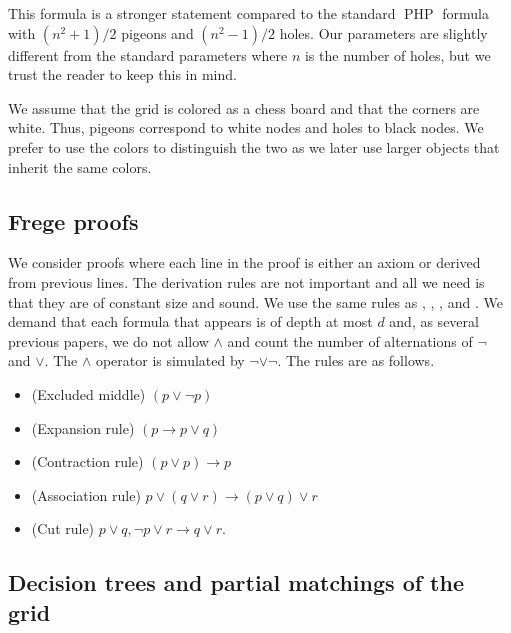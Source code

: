 \documentclass{article}\usepackage[a4paper,margin=20mm]{geometry}
\DeclareMathOperator{\PHP}{PHP}
\begin{document}
This formula is a stronger statement compared to
the standard $\PHP$ formula with
$(n^2+1)/2$ pigeons and $(n^2-1)/2$ holes.  Our
parameters are slightly different from the standard parameters
where $n$ is the number of holes, but we trust the reader to
keep this in mind.

We assume that the grid is colored as a chess board and
that the corners are white.  Thus, pigeons correspond to white
nodes and holes to black nodes.  We prefer to use the colors to
distinguish the two as we later use larger objects that inherit
the same colors.


\subsection{Frege proofs}\label{sec:frege}

We consider proofs where each line in the proof
is either an axiom or derived from previous lines.
The derivation rules are not important and all we need
is that they are of constant size and sound.  
We use the same rules as \cite{pitassi16frege}, \cite{jhtseitin},
\cite{PRT21}, and \cite{jhkr}.   We demand that each formula that appears
is of depth at most $d$ and, as several previous papers, we do not allow
$\land$ and count the number of alternations of $\neg$ and $\lor$.
The $\land$ operator is simulated by $\neg \lor \neg$.
The rules are as follows.


\begin{itemize}

\item  (Excluded middle) $(p \lor \neg p)$

\item  (Expansion rule) $(p \rightarrow p \lor q)$

\item (Contraction rule) $(p \lor p) \rightarrow p$

\item (Association rule) $p \lor (q \lor r) \rightarrow (p \lor q) \lor r$

\item (Cut rule) $p \lor q, \neg p \lor r \rightarrow q \lor r$. 

\end{itemize}

\subsection{Decision trees and partial matchings of the grid}
\end{document}
